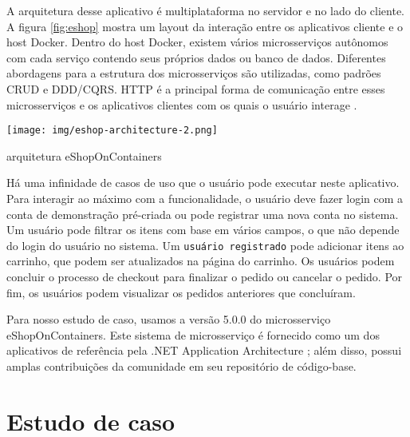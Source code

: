 A arquitetura desse aplicativo é multiplataforma no servidor e no lado do cliente. A figura \ref{fig:eshop} mostra um layout da interação entre os aplicativos cliente e o host Docker. Dentro do host Docker, existem vários microsserviços autônomos com cada serviço contendo seus próprios dados ou banco de dados. Diferentes abordagens para a estrutura dos microsserviços são utilizadas, como padrões CRUD e DDD/CQRS. HTTP é a principal forma de comunicação entre esses microsserviços e os aplicativos clientes com os quais o usuário interage \cite{eshop}.

\begin{figura}[h]
     \centering
     \texttt{[image: img/eshop-architecture-2.png]}
        \caption{arquitetura eShopOnContainers \cite{eshop}}
        \label{fig:eshop}
\end{figura}

Há uma infinidade de casos de uso que o usuário pode executar neste aplicativo. Para interagir ao máximo com a funcionalidade, o usuário deve fazer login com a conta de demonstração pré-criada ou pode registrar uma nova conta no sistema. Um usuário pode filtrar os itens com base em vários campos, o que não depende do login do usuário no sistema. Um \texttt{usuário registrado} pode adicionar itens ao carrinho, que podem ser atualizados na página do carrinho. Os usuários podem concluir o processo de checkout para finalizar o pedido ou cancelar o pedido. Por fim, os usuários podem visualizar os pedidos anteriores que concluíram.

  Para nosso estudo de caso, usamos a versão 5.0.0 do microsserviço eShopOnContainers. Este sistema de microsserviço é fornecido como um dos aplicativos de referência pela .NET Application Architecture \cite{eshop}; além disso, possui amplas contribuições da comunidade em seu repositório de código-base.



\section{Estudo de caso}\label{sec:use_case}

